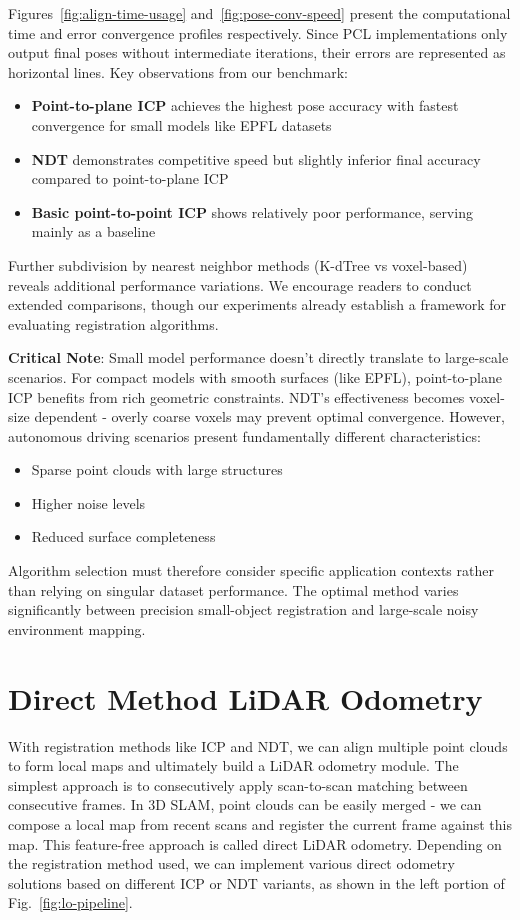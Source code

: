 Figures~\ref{fig:align-time-usage} and~\ref{fig:pose-conv-speed} present the computational time and error convergence profiles respectively. Since PCL implementations only output final poses without intermediate iterations, their errors are represented as horizontal lines. Key observations from our benchmark:

\begin{itemize}
	\item \textbf{Point-to-plane ICP} achieves the highest pose accuracy with fastest convergence for small models like EPFL datasets
	\item \textbf{NDT} demonstrates competitive speed but slightly inferior final accuracy compared to point-to-plane ICP
	\item \textbf{Basic point-to-point ICP} shows relatively poor performance, serving mainly as a baseline
\end{itemize}

Further subdivision by nearest neighbor methods (K-dTree vs voxel-based) reveals additional performance variations. We encourage readers to conduct extended comparisons, though our experiments already establish a framework for evaluating registration algorithms. 

\textbf{Critical Note}: Small model performance doesn't directly translate to large-scale scenarios. For compact models with smooth surfaces (like EPFL), point-to-plane ICP benefits from rich geometric constraints. NDT's effectiveness becomes voxel-size dependent - overly coarse voxels may prevent optimal convergence. However, autonomous driving scenarios present fundamentally different characteristics:

\begin{itemize}
	\item Sparse point clouds with large structures
	\item Higher noise levels
	\item Reduced surface completeness
\end{itemize}

Algorithm selection must therefore consider specific application contexts rather than relying on singular dataset performance. The optimal method varies significantly between precision small-object registration and large-scale noisy environment mapping.

\section{Direct Method LiDAR Odometry}
With registration methods like ICP and NDT, we can align multiple point clouds to form local maps and ultimately build a LiDAR odometry module. The simplest approach is to consecutively apply scan-to-scan matching between consecutive frames. In 3D SLAM, point clouds can be easily merged - we can compose a local map from recent scans and register the current frame against this map. This feature-free approach is called direct LiDAR odometry. Depending on the registration method used, we can implement various direct odometry solutions based on different ICP or NDT variants, as shown in the left portion of Fig.~\ref{fig:lo-pipeline}.

